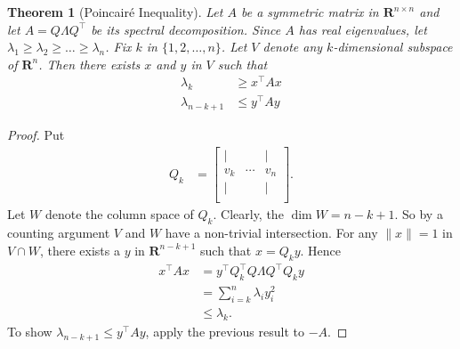 \documentclass[]{article}
\theoremstyle{plain}
\newtheorem{thm}{Theorem}
\theoremstyle{definition}
\theoremstyle{remark}
\newcommand{\reals}{\mathbf{R}}
\begin{document}
\begin{thm}[Poincair\'{e} Inequality]
Let $A$ be a symmetric matrix in $\reals^{n \times n}$ and let
$A = Q\Lambda Q^\top$ be its spectral decomposition.  Since $A$
has real eigenvalues, let $\lambda_1 \ge \lambda_2 \ge \dots \ge \lambda_n$.
Fix $k$ in $\{1, 2, \dots, n\}$.
Let $V$ denote any $k$-dimensional subspace of $\reals^n$.  Then
there exists $x$ and $y$ in $V$ such that
\begin{align*}
\lambda_k &\ge x^\top A x \\
\lambda_{n-k+1} &\le y^\top A y
\end{align*}
\end{thm}
\begin{proof}
Put
\begin{align*}
Q_k &=  \begin{bmatrix} | & & | \\
  v_k & \cdots & v_n   \\
  | &  & | \\ 
\end{bmatrix}.
\end{align*}
Let $W$ denote the column space of $Q_k$.  Clearly, the $\dim W = n-k+1$.  So
by a counting argument $V$ and $W$ have a non-trivial intersection.  For any
$\|x\|=1$ in $V \cap W$, there exists a $y$ in $\reals^{n-k+1}$ such that
$x = Q_k y$. Hence
\begin{align*}
x^\top A x &= y^\top Q_k^\top Q\Lambda Q^\top Q_k y \\
   &= \sum_{i=k}^n \lambda_i y_i^2 \\
   &\le \lambda_k.
\end{align*}
To show $\lambda_{n-k+1} \le y^\top A y$, apply the previous result
to $-A$.
\end{proof}
\end{document}
